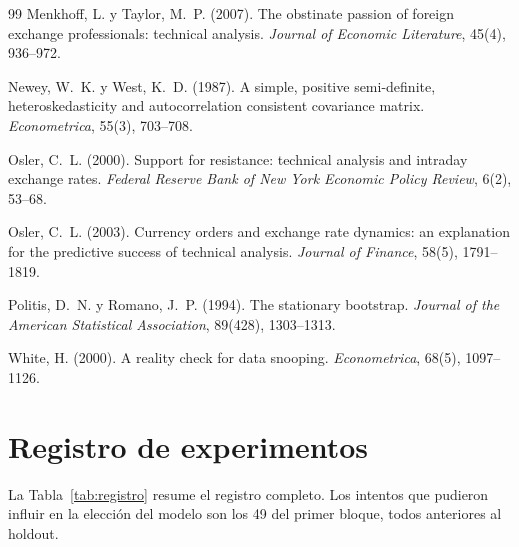 \documentclass[10pt,a4paper]{article}
\begin{document}
\begin{thebibliography}{99}
Menkhoff, L. y Taylor, M.~P. (2007). The obstinate passion of foreign exchange
professionals: technical analysis. \textit{Journal of Economic Literature}, 45(4),
936--972.

Newey, W.~K. y West, K.~D. (1987). A simple, positive semi-definite,
heteroskedasticity and autocorrelation consistent covariance matrix.
\textit{Econometrica}, 55(3), 703--708.

Osler, C.~L. (2000). Support for resistance: technical analysis and intraday
exchange rates. \textit{Federal Reserve Bank of New York Economic Policy Review},
6(2), 53--68.

Osler, C.~L. (2003). Currency orders and exchange rate dynamics: an explanation
for the predictive success of technical analysis. \textit{Journal of Finance},
58(5), 1791--1819.

Politis, D.~N. y Romano, J.~P. (1994). The stationary bootstrap. \textit{Journal
of the American Statistical Association}, 89(428), 1303--1313.

White, H. (2000). A reality check for data snooping. \textit{Econometrica}, 68(5),
1097--1126.
\end{thebibliography}

\clearpage
\appendix
\section{Registro de experimentos}\label{app:registro}

La Tabla~\ref{tab:registro} resume el registro completo. Los intentos que pudieron
influir en la elección del modelo son los 49 del primer bloque, todos anteriores al
holdout.
\end{document}

